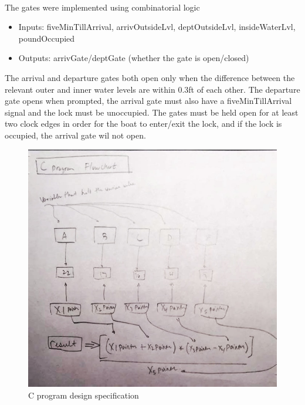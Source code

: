 \documentclass{article}
\begin{document}
      \paragraph{} The gates were implemented using combinatorial logic
      \begin{itemize}
        \item Inputs: fiveMinTillArrival, arrivOutsideLvl, deptOutsideLvl, insideWaterLvl, poundOccupied
        \item Outputs: arrivGate/deptGate (whether the gate is open/closed)
      \end{itemize}
      The arrival and departure gates both open only when the difference between the relevant outer and inner water levels are within 0.3ft of each other. The departure gate opens when prompted, the arrival gate must also have a fiveMinTillArrival signal and the lock must be unoccupied. The gates must be held open for at least two clock edges in order for the boat to enter/exit the lock, and if the lock is occupied, the arrival gate wil not open.

      \begin{figure}[H]
        \centering
        \includegraphics[width=0.75\linewidth]{figures/c/C_diagram.jpeg}
        \caption{C program design specification}
        \label{fig:C_program_design}
      \end{figure}
\end{document}
